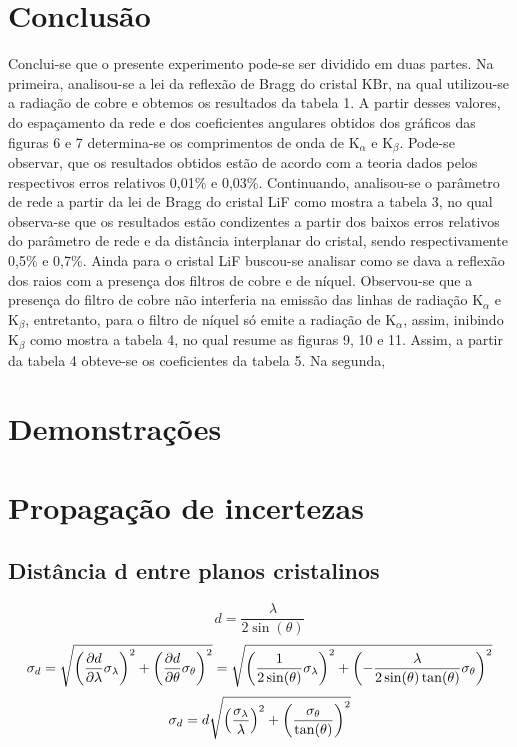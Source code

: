 \documentclass[article,12pt,openright,oneside,a4paper,brazil]{abntex2}
\begin{document}
\section{Conclusão}
Conclui-se que o presente experimento pode-se ser dividido em duas partes. Na primeira, analisou-se a lei da reflexão de Bragg do cristal KBr, na qual utilizou-se a radiação de cobre e obtemos os resultados da tabela 1. A partir desses valores, do espaçamento da rede e dos coeficientes angulares obtidos dos gráficos das figuras 6 e 7 determina-se os comprimentos de onda de K$_\alpha$ e K$_\beta$. Pode-se observar, que os resultados obtidos estão de acordo com a teoria dados pelos respectivos erros relativos 0,01\% e 0,03\%. Continuando, analisou-se o parâmetro de rede a partir da lei de Bragg do cristal LiF como mostra a tabela 3, no qual observa-se que os resultados estão condizentes a partir dos baixos erros relativos do parâmetro de rede e da distância interplanar do cristal, sendo respectivamente 0,5\% e 0,7\%. Ainda para o cristal LiF buscou-se analisar como se dava a reflexão dos raios com a presença dos filtros de cobre e de níquel. Observou-se que a presença do filtro de cobre não interferia na emissão das linhas de radiação K$_\alpha$ e K$_\beta$, entretanto, para o filtro de níquel só emite a radiação de K$_\alpha$, assim, inibindo K$_\beta$ como mostra a tabela 4, no qual resume as figuras 9, 10 e 11. Assim, a partir da tabela 4 obteve-se os coeficientes da tabela 5. Na segunda,    

\appendix

\newpage




\nocite{*}

\section{Demonstrações}

\section{Propagação de incertezas}

\subsection{Distância d entre planos cristalinos}
$$d=\frac{\lambda}{2\sin(\theta)}$$
$$\sigma_d=\sqrt{\qty(\pdv{d}{\lambda}\sigma_\lambda)^2+\qty(\pdv{d}{\theta}\sigma_\theta)^2}=\sqrt{\qty(\frac{1}{2\sin(\theta)}\sigma_\lambda)^2+\qty(-\frac{\lambda}{2\sin(\theta)\tan(\theta)}\sigma_\theta)^2}$$
$$\sigma_d=d\sqrt{\qty(\frac{\sigma_\lambda}{\lambda})^2+\qty(\frac{\sigma_\theta}{\tan(\theta)})^2}$$
\end{document}
